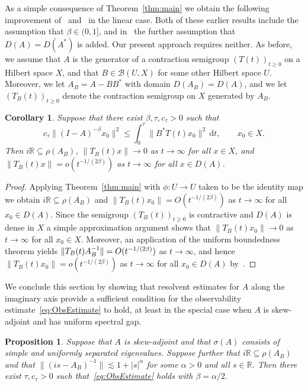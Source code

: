 \documentclass[11pt, a4paper]{amsart}
\newcommand{\dd}{\mathrm{d}}
\newcommand{\B}{\mathcal{B}}
\newcommand{\RR}{\mathbb{R}}
\newcommand{\inv}{^{-1}}
\newcommand{\T}{(T(t))_{t\ge0}}
\newtheorem{prp}[thm]{Proposition}
\newtheorem{cor}[thm]{Corollary}
\theoremstyle{definition}
\numberwithin{equation}{section}
\begin{document}
As a simple consequence of Theorem~\ref{thm:main} we obtain the following improvement of~\cite[Thm.~4.4]{ChiPau23} and~\cite[Thm.~4.2]{PauSei25a} in the linear case. Both of these earlier results include the assumption that $\beta\in(0,1]$, and in~\cite[Thm.~4.4]{ChiPau23} the further assumption that $D(A)=D(A^*)$ is added. Our present approach requires neither. As before, we assume that $A$ is the generator of a contraction semigroup $\T$ on a Hilbert space $X$, and that $B\in \B(U,X)$ for some other Hilbert space $U$. Moreover, we let $A_B=A-BB^*$ with domain $D(A_B)=D(A)$, and we let $(T_B(t))_{t\ge0}$ denote the contraction semigroup on $X$ generated by $A_B$.

\begin{cor}
\label{cor:LinearABBimproved}
 Suppose that there exist $\beta,\tau,c_\tau>0$ such that
$$c_\tau\|(I-A)^{-\beta} x_0\|^2 
\le \int_0^\tau \|B^\ast T(t)x_0\|^2 \,\dd t, \qquad x_0\in X.$$
Then
 $i\RR\subseteq\rho(A_B)$, $\|T_B(t)x\|\to 0$ as $t\to\infty$ for all $x\in X$, and $\|T_B(t)x\|=o(t^{-1/(2\beta)})$ as $t\to\infty$ for all $x\in D(A)$.
\end{cor}

\begin{proof}
Applying Theorem~\ref{thm:main} with $\phi\colon U\to U$ taken to be the identity map we obtain $i\RR\subseteq \rho(A_B)$ and  $\|T_B(t)x_0\|=O(t^{-1/(2\beta)})$ as $t\to\infty$ for all $x_0\in D(A)$. Since the semigroup $(T_B(t))_{t\ge0}$ is contractive and $D(A)$ is dense in $X$ a simple approximation argument shows that $\|T_B(t)x_0\|\to0$ as $t\to\infty$ for all $x_0\in X$. Moreover, an application of the uniform boundedness theorem yields $\|T_B(t)\smash{A_B\inv}\|=O(t^{-1/(2\beta)})$ as $t\to\infty$, and hence $\|T_B(t)x_0\|=o(t^{-1/(2\beta)})$ as $t\to\infty$ for all $x_0\in D(A)$ by~\cite[Thm.~2.4]{BorTom10}.
\end{proof}

We conclude this section by showing that resolvent estimates for $A$ along the imaginary axis provide a sufficient condition for the observability estimate~\eqref{eq:ObsEstimate} to hold, at least in the special case when $A$ is skew-adjoint and has uniform spectral gap.

\begin{prp}\label{prp:obs}
Suppose that $A$ is skew-adjoint and that $\sigma(A)$ consists of simple and uniformly separated eigenvalues. Suppose further that $i\RR\subseteq\rho(A_B)$ and that $\|(is-A_B)\inv\|\lesssim 1+|s|^\alpha$ for some $\alpha>0$ and all $s\in\RR$. Then there exist $\tau,c_\tau>0$ such that~\eqref{eq:ObsEstimate} holds with $\beta=\alpha/2$.
\end{prp}
\end{document}
